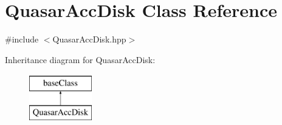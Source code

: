\hypertarget{classQuasarAccDisk}{\section{Quasar\-Acc\-Disk Class Reference}
\label{classQuasarAccDisk}
}


{\ttfamily \#include $<$Quasar\-Acc\-Disk.\-hpp$>$}

Inheritance diagram for Quasar\-Acc\-Disk\-:\begin{figure}[H]
\begin{center}
\leavevmode
\includegraphics[height=2.000000cm]{classQuasarAccDisk}
\end{center}
\end{figure}


